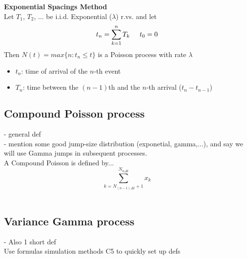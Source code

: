 \textbf{Exponential Spacings Method}\\
Let $T_1$, $T_2$, $\ldots$ be i.i.d. Exponential ($\lambda$) r.vs. and let
\begin{equation}
t_{n} = \sum_{k=1}^{n} T_k \hspace{0.5cm}t_0=0
\end{equation} 
Then $N(t) = max\{n: t_n \leq t\}$ is a Poisson process with rate $\lambda$
\begin{itemize}
    \item $t_n$: time of arrival of the $n$-th event
    \item $T_n$: time between the $(n-1)$th and the $n$-th arrival ($t_n - t_{n-1}$)
\end{itemize}



\subsection{Compound Poisson process}
- general def\\
- mention some good jump-size distribution (exponetial, gamma,...), and say we will use Gamma jumps in subsequent processes.\\

A Compound Poisson is defined by...\\

\begin{equation}
\sum_{k=N_{(n-1)\Delta t}+1}^{N_{n\Delta t}} x_{k}
\label{eq:5-2 Gamma-OU BDLP Compound Poisson Approximation}
\end{equation}\\



\subsection{Variance Gamma process}
- Also 1 short def\\

Use formulas simulation methods C5 to quickly set up defs\\

